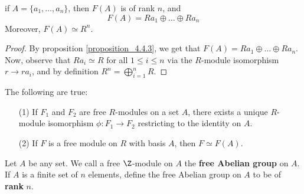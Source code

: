 \begin{corollary}
if $A=\{a_1, \dots, a_n\}$, then $F(A)$ is of rank $n$, and
  \begin{equation*}
    F(A)=Ra_1 \oplus \dots \oplus Ra_n
  \end{equation*}
  Moreover, $F(A) \simeq R^n$.
\end{corollary}
\begin{proof}
  By proposition \ref{proposition_4.4.3}, we get that $F(A)=Ra_1
  \oplus \dots \oplus Ra_n$. Now, observe that $Ra_i \simeq R$ for all
  $1 \leq i \leq n$ via the $R$-module isomorphism  $r \xrightarrow{}
  ra_i$, and by definition $R^n=\bigoplus_{i=1}^n{R}$.
\end{proof}
\begin{corollary}
  The following are true:
  \begin{enumerate}
    \item[(1)] If $F_1$ and $F_2$ are free $R$-modules on a set  $A$,
      there exists a unique  $R$-module isomorphism $\phi:F_1
      \xrightarrow{} F_2$ restricting to the identity on $A$.

    \item[(2)] If $F$ is a free module on $R$ with basis $A$, then  $F
      \simeq F(A)$.
  \end{enumerate}
\end{corollary}

\begin{definition}
  Let $A$ be any set. We call a free $\Z$-module on $A$ the
  \textbf{free Abelian group} on $A$. If  $A$ is a finite set of  $n$
  elements, define the free Abelian group on $A$ to be of
  \textbf{rank} $n$.
\end{definition}
